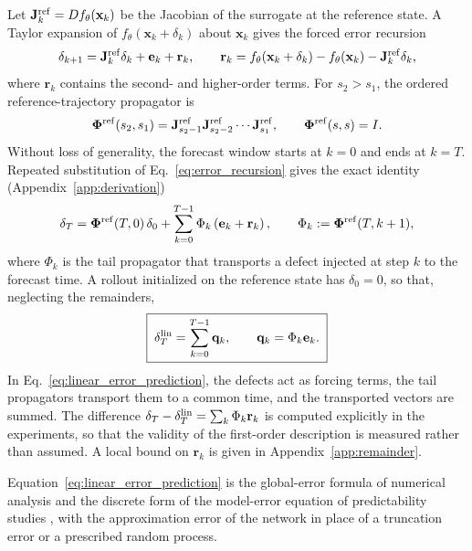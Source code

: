 Let $\mathbf J^{\rm ref}_k=Df_\theta(\mathbf x_k)$ be the Jacobian of the surrogate at the reference state. A Taylor expansion of $f_\theta(\mathbf x_k+\delta_k)$ about $\mathbf x_k$ gives the forced error recursion
\begin{equation}
  \delta_{k+1}=\mathbf J^{\rm ref}_k\delta_k+\mathbf e_k+\mathbf r_k,
  \qquad
  \mathbf r_k=f_\theta(\mathbf x_k+\delta_k)-f_\theta(\mathbf x_k)-\mathbf J^{\rm ref}_k\delta_k,
  \label{eq:error_recursion}
\end{equation}
where $\mathbf r_k$ contains the second- and higher-order terms. For $s_2>s_1$, the ordered reference-trajectory propagator is
\begin{equation}
  \boldsymbol{\Phi}^{\rm ref}(s_2,s_1)=\mathbf J^{\rm ref}_{s_2-1}\mathbf J^{\rm ref}_{s_2-2}\cdots\mathbf J^{\rm ref}_{s_1},
  \qquad \boldsymbol{\Phi}^{\rm ref}(s,s)=I.
  \label{eq:reference_propagator}
\end{equation}
Without loss of generality, the forecast window starts at $k=0$ and ends at $k=T$. Repeated substitution of Eq.~\eqref{eq:error_recursion} gives the exact identity (Appendix~\ref{app:derivation})
\begin{equation}
\delta_{T}=\boldsymbol{\Phi}^{\rm ref}(T,0)\,\delta_0+\sum_{k=0}^{T-1}\Phi_k\left(\mathbf e_{k}+\mathbf r_{k}\right),
\qquad
\Phi_k:=\boldsymbol{\Phi}^{\rm ref}(T,k+1),
\label{eq:error_decomposition}
\end{equation}
where $\Phi_k$ is the tail propagator that transports a defect injected at step $k$ to the forecast time. A rollout initialized on the reference state has $\delta_0=0$, so that, neglecting the remainders,
\begin{equation}
  \boxed{\;
  \delta^{\rm lin}_{T}=\sum_{k=0}^{T-1}\mathbf q_k,
  \qquad
  \mathbf q_k=\Phi_k\mathbf e_k.
  \;}
  \label{eq:linear_error_prediction}
\end{equation}
In Eq.~\eqref{eq:linear_error_prediction}, the defects act as forcing terms, the tail propagators transport them to a common time, and the transported vectors are summed. The difference $\delta_T-\delta^{\rm lin}_T=\sum_k\Phi_k\mathbf r_k$ is computed explicitly in the experiments, so that the validity of the first-order description is measured rather than assumed. A local bound on $\mathbf r_k$ is given in Appendix~\ref{app:remainder}.

Equation~\eqref{eq:linear_error_prediction} is the global-error formula of numerical analysis \citep[Section~II.3]{hairer1993} and the discrete form of the model-error equation of predictability studies \citep{nicolis2003,vannitsem2002,carrassi2008}, with the approximation error of the network in place of a truncation error or a prescribed random process.

